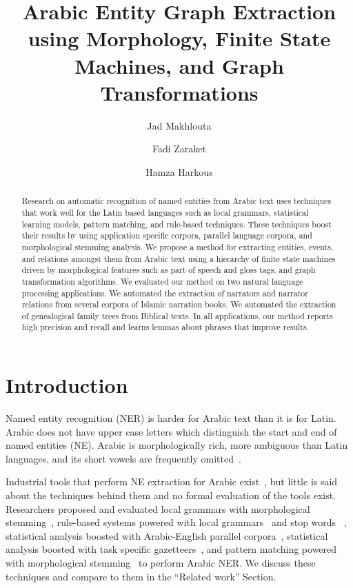 \documentclass{llncs}
\title{Arabic Entity Graph Extraction using Morphology, Finite State Machines, and Graph Transformations}
\author{ Jad Makhlouta\inst{1} \and
    Fadi Zaraket\inst{1} \and 
Hamza Harkous\inst{1} }
\institute{ American University of Beirut \\
  \email{ \{jem04, fz11, hhh20\}@aub.edu.lb } }
\date{}
\begin{document}
\maketitle

\begin{abstract}
Research on automatic recognition of named entities
from Arabic text uses techniques that work well for the 
Latin based languages such as local grammars, 
statistical learning models, pattern matching, 
and rule-based techniques. 
These techniques boost their results by using application 
specific 
corpora, parallel language corpora,
and morphological stemming analysis. 
We propose a method for extracting entities, events, 
and relations amongst them
from Arabic text using 
a hierarchy of finite state machines driven by morphological 
features such as part of speech and gloss tags,
and graph transformation algorithms. 
We evaluated our method on two natural language processing 
applications.
We automated the extraction of narrators and 
narrator relations from 
several corpora of Islamic narration books. 
We automated the extraction of genealogical family trees 
from Biblical texts. 
In all applications, our method reports high precision and recall
and learns lemmas about phrases that improve results. 
\end{abstract}


\section{Introduction}
Named entity recognition (NER) is harder for Arabic text than 
it is for Latin. 
Arabic does not have upper case letters which distinguish the 
start and end of named entities (NE).
Arabic is morphologically rich, 
more ambiguous than Latin languages,
and its short vowels are frequently omitted~\cite{Debili1998}.

Industrial tools that perform NE extraction for Arabic exist~\cite{Sak09,IdentiFinder,basis:06,ANEE:07},
but little is said about the techniques behind them and no formal evaluation of the tools exist. 
Researchers proposed and evaluated 
local grammars with morphological stemming~\cite{ZAGHOUANI10,Traboulsi:09},
rule-based systems powered with local grammars~\cite{ShaalanR09} 
and stop words ~\cite{Abuleil04},
statistical analysis boosted with Arabic-English parallel corpora~\cite{BenajibaZDR10}, 
statistical analysis boosted with task specific gazetteers~\cite{Benajiba:07,Benajiba:08},
and pattern matching powered with morphological stemming~\cite{jumaily2011,TAGARAB98}
to perform Arabic NER.
We discuss these techniques and compare to them in 
the ``Related work'' Section.
\end{document}
